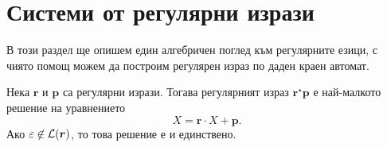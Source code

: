 \section{Системи от регулярни изрази}

В този раздел ще опишем един алгебричен поглед към регулярните езици, с чиято помощ можем да построим регулярен израз по даден краен автомат.

\begin{important}
  \begin{lemma}
    \label{lem:regular:system:arden}
    Нека $\bm{r}$  и $\bm{p}$ са регулярни изрази.
    Тогава регулярният израз $\bm{r}^\star \bm{p}$ е най-малкото решение на уравнението
    \begin{equation}
      \label{eq:system:arden}
      X = \bm{r} \cdot X + \bm{p}.
    \end{equation}
    Ако $\varepsilon  \not \in \mathcal{L}(\bm{r})$, то това решение е и единствено.
  \end{lemma}
\end{important}

